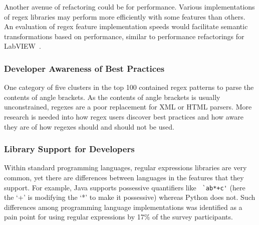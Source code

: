 Another avenue of refactoring could be for performance. Various implementations of regex libraries may perform more efficiently with some features than others. An evaluation of regex feature implementation speeds would facilitate semantic transformations based on performance, similar to performance refactorings for LabVIEW~\cite{chambers2013smell, chambers2015impact}. 



\subsubsection{Developer Awareness of Best Practices}
One category of five clusters in the top 100 contained regex patterns to parse the contents of angle brackets.  As the contents of angle brackets is usually unconstrained, regexes are a poor replacement for XML or HTML parsers.  More research is needed into how regex users discover best practices and how aware they are of how regexes should and should not be used.

\subsubsection{Library Support for Developers}
Within standard programming languages, regular expressions libraries are very common, yet there are  differences between languages in the features that they support. For example, Java supports possessive quantifiers like \verb! `ab*+c'! (here the `+' is modifying the `*' to make it possessive) whereas Python does not. Such differences among programming language implementations was identified as a pain point for using regular expressions by 17\% of the survey participants.  


